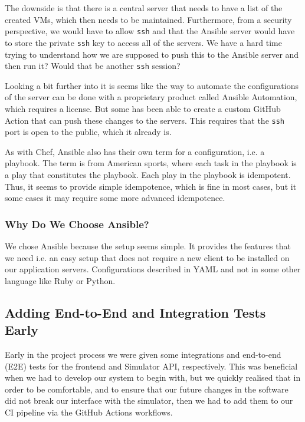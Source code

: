The downside is that there is a central server that needs to have a list of the created VMs, which then needs to be maintained. Furthermore, from a security perspective, we would have to allow \texttt{ssh} and that the Ansible server would have to store the private \texttt{ssh} key to access all of the servers. We have a hard time trying to understand how we are supposed to push this to the Ansible server and then run it? Would that be another \texttt{ssh} session?

Looking a bit further into it is seems like the way to automate the configurations of the server can be done with a proprietary product called Ansible Automation, which requires a license. But some has been able to create a custom GitHub Action that can push these changes to the servers. This requires that the \texttt{ssh} port is open to the public, which it already is.

As with Chef, Ansible also has their own term for a configuration, i.e. a playbook. The term is from American sports, where each task in the playbook is a play that constitutes the playbook. Each play in the playbook is idempotent. Thus, it seems to provide simple idempotence, which is fine in most cases, but it some cases it may require some more advanced idempotence.

\subsubsection{Why Do We Choose Ansible?}

We chose Ansible because the setup seems simple. It provides the features that we need i.e. an easy setup that does not require a new client to be installed on our application servers. Configurations described in YAML and not in some other language like Ruby or Python.

\subsection{Adding End-to-End and Integration Tests Early}

Early in the project process we were given some integrations and end-to-end (E2E) tests for the frontend and Simulator API, respectively. This was beneficial when we had to develop our system to begin with, but we quickly realised that in order to be comfortable, and to ensure that our future changes in the software did not break our interface with the simulator, then we had to add them to our CI pipeline via the GitHub Actions workflows.

